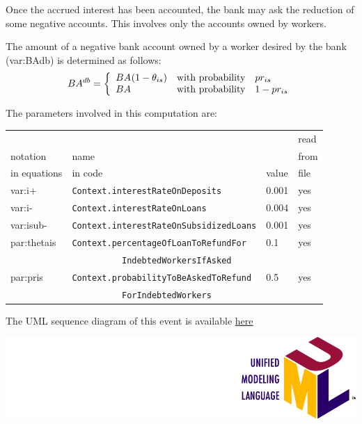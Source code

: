 \documentclass{book}
\newcommand{\doclocation}{file:///Users/giulioni/Documents/workspace/gabriele/docs}
\begin{document}
Once the accrued interest has been accounted, the bank may ask the reduction of some negative accounts. This involves only the accounts owned by workers.

 
The amount of a negative bank account owned by a worker desired by the bank (\gls{var:BAdb}) is determined as follows:
\[
	BA^{db}=\left\{ 
		\begin{array}{l l l}
			BA_{}(1-\theta_{is})&\textnormal{with probability}& pr_{is}\\
			BA_{}&\textnormal{with probability}& 1-pr_{is}\\
		\end{array}
		\right.
\]

The parameters involved in this computation are:

\vskip2mm
\begin{tabular}{l l l l}
	\hline
	& &&read\\
	notation& name &&from\\
	in equations& in code&value&file\\
	\hline
	\hline
	\gls{var:i+}&\verb+Context.interestRateOnDeposits+&0.001&yes\\
\gls{var:i-}&\verb+Context.interestRateOnLoans+&0.004&yes\\
\gls{var:isub-}&\verb+Context.interestRateOnSubsidizedLoans+&0.001&yes\\
\gls{par:thetais}&\verb+Context.percentageOfLoanToRefundFor+&0.1&yes\\
&\verb+          IndebtedWorkersIfAsked+&&\\
\gls{par:pris}&\verb+Context.probabilityToBeAskedToRefund+&0.5&yes\\
&\verb+          ForIndebtedWorkers+&&\\
	\hline
\end{tabular}

\vskip2mm

The UML sequence diagram of this event is available \href{\doclocation/umldoc/updateConsumersAccounts.html}{here}
\begin{marginfigure}
	\includegraphics[scale=0.1]{uml.png}
\end{marginfigure}
\end{document}
